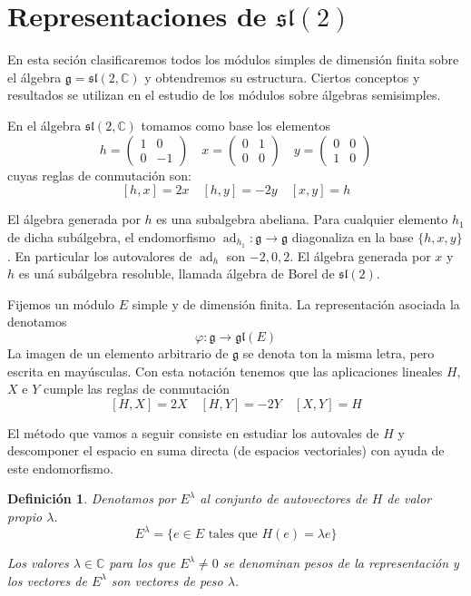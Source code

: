 \documentclass[a4paper,draft,12pt]{scrartcl}
\newtheorem{defi}{Definición}[section]%
\newcommand{\C}{\mathbb{C}}%
\newcommand{\g}{\mathfrak{g}}%
\newcommand{\lto}{\longrightarrow}%
\newcommand{\df}[1]{\textsf{\color{blue}#1}}
\DeclareMathOperator{\ad}{ad}  %
\begin{document}
\newpage

\section{Representaciones de $\mathfrak{sl}(2)$}

En esta seción clasificaremos todos los módulos simples de dimensión finita sobre el álgebra $\g= \mathfrak{sl}(2, \C)$ y obtendremos su estructura.  Ciertos conceptos y resultados se utilizan en el estudio de los módulos sobre álgebras semisimples.

\bigskip

En el álgebra $\mathfrak{sl}(2, \C)$ tomamos como base los elementos
$$
h= 
\begin{pmatrix}
1 & 0 \\
0 & -1
\end{pmatrix}
\quad
x =
\begin{pmatrix}
0 & 1 \\
0 & 0 
\end{pmatrix}
\quad
y= 
\begin{pmatrix}
0 & 0 \\
1 & 0 
\end{pmatrix}
$$
cuyas reglas de conmutación son:
$$
[h,x]= 2x \quad [h,y]= -2y \quad [x,y]= h
$$

\bigskip


El álgebra generada por $h$ es una subalgebra abeliana.  Para cualquier elemento $h_1$ de dicha subálgebra, el endomorfismo $\ad_{h_1} : \g \rightarrow \g$ diagonaliza en la base $\{h,x,y\}$.  En particular los autovalores de $\ad_h$ son $-2,0,2$. 
El álgebra generada por $x$ y $h$ es uná subálgebra resoluble, llamada álgebra de Borel de $\mathfrak{sl}(2)$.

\bigskip

Fijemos un módulo $E$ simple y de dimensión finita.  La representación asociada la denotamos
$$
\varphi: \g \lto \mathfrak{gl}(E)
$$
La imagen de un elemento arbitrario de $\g$ se denota ton la misma letra, pero escrita en mayúsculas.  Con esta notación tenemos que las aplicaciones lineales $H$, $X$ e $Y$ cumple las reglas de conmutación
$$
[H,X]= 2X \quad [H,Y]= -2Y \quad [X,Y]= H
$$

El método que vamos a seguir consiste en estudiar los autovales de $H$ y descomponer el espacio en suma directa (de espacios vectoriales) con ayuda de este endomorfismo.

\begin{defi}

Denotamos por $E^\lambda$ al conjunto de autovectores de $H$ de valor propio $\lambda$.
$$
E^\lambda=\{e \in E \text{ tales que } H(e)= \lambda e\}
$$

Los valores $\lambda \in \C$ para los que $E^\lambda \neq 0$ se denominan  \df{pesos} de la representación y los vectores de $E^\lambda$ son vectores de peso $\lambda$.

\end{defi}
\end{document}
